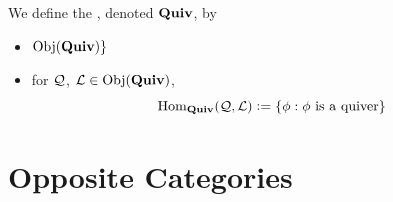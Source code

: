 \documentclass{book}
\begin{document}
	\begin{defn}
		We define the , denoted $\text{\textbf{Quiv}}$, by 
		\begin{itemize}
			\item $\Obj(\bQuiv) \def \{\MQ: \text{$\MQ$ is a quiver}\}$
			\item for $\mathcal{Q}$, $\mathcal{L} \in \operatorname{Obj}(\text{\textbf{Quiv}})$, 
			$$\operatorname{Hom}_{\text{\textbf{Quiv}}}(\mathcal{Q}, \mathcal{L}) \vcentcolon= \{\phi: \text{$\phi$ is a quiver} \}$$
		\end{itemize}
	\end{defn}
	
	
	
	
	
	
	
	
	
	
	
	
	
	
	
	
	
	
	
	
	
	
	
	
	
	
	
	
	


















	













































	
	
	\section{Opposite Categories}
\end{document}
